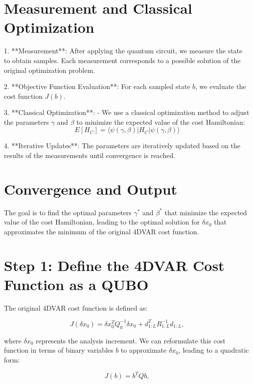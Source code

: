 \documentclass{article}
\begin{document}
\section{Measurement and Classical Optimization}

1. **Measurement**: After applying the quantum circuit, we measure the state to obtain samples. Each measurement corresponds to a possible solution of the original optimization problem.

2. **Objective Function Evaluation**: For each sampled state \( b \), we evaluate the cost function \( J(b) \).

3. **Classical Optimization**:
   - We use a classical optimization method to adjust the parameters \( \gamma \) and \( \beta \) to minimize the expected value of the cost Hamiltonian:
   \[
   E[H_C] = \langle \psi(\gamma, \beta) | H_C | \psi(\gamma, \beta) \rangle
   \]

4. **Iterative Updates**: The parameters are iteratively updated based on the results of the measurements until convergence is reached.

\section{Convergence and Output}

The goal is to find the optimal parameters \( \gamma^* \) and \( \beta^* \) that minimize the expected value of the cost Hamiltonian, leading to the optimal solution for \( \delta x_0 \) that approximates the minimum of the original 4DVAR cost function.

\section{Step 1: Define the 4DVAR Cost Function as a QUBO}

The original 4DVAR cost function is defined as:

\begin{equation}
J(\delta x_0) = \delta x_0^T Q_0^{-1} \delta x_0 + d_{1:L}^T R_{1:L}^{-1} d_{1:L},
\end{equation}

where \( \delta x_0 \) represents the analysis increment. We can reformulate this cost function in terms of binary variables \( b \) to approximate \( \delta x_0 \), leading to a quadratic form:

\begin{equation}
J(b) = b^T Q b,
\end{equation}
\end{document}
